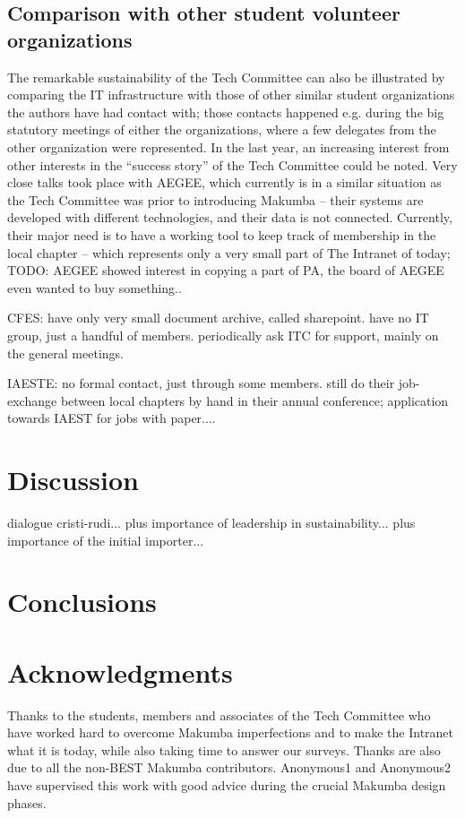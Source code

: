 \documentclass{acm_proc_article-sp}
\begin{document}
\subsection{Comparison with other student volunteer organizations}
The remarkable sustainability of the Tech Committee can also be illustrated by comparing the IT infrastructure with those of other similar student organizations the authors have had contact with; those contacts happened e.g. during the big statutory meetings of either the organizations, where a few delegates from the other organization were represented. In the last year, an increasing interest from other interests in the ``success story'' of the Tech Committee could be noted. Very close talks took place with AEGEE, which currently is in a similar situation as the Tech Committee was prior to introducing Makumba -- their systems are developed with different technologies, and their data is not connected. Currently, their major need is to have a working tool to keep track of membership in the local chapter -- which represents only a very small part of The Intranet of today;
TODO: AEGEE showed interest in copying a part of PA, the board of AEGEE even wanted to buy something..

CFES: have only very small document archive, called sharepoint. have no IT group, just a handful of members. periodically ask ITC for support, mainly on the general meetings.

IAESTE: no formal contact, just through some members. still do their job-exchange between local chapters by hand in their annual conference; application towards IAEST for  jobs with paper....


\section{Discussion}\label{sec:disco}
dialogue cristi-rudi... plus importance of leadership in sustainability... plus importance of the initial importer...


\section{Conclusions}\label{sec:conclusions}

\section{Acknowledgments}\label{sec:acknowledgments}
Thanks to the students, members and associates of the Tech Committee who have worked hard to overcome Makumba imperfections and to make the Intranet what it is today, while also taking time to answer our surveys.  Thanks are also due to all the non-BEST Makumba contributors.  Anonymous1 and Anonymous2 have supervised this work with good advice during the crucial Makumba design phases.

%

 

%

\balancecolumns
\end{document}
